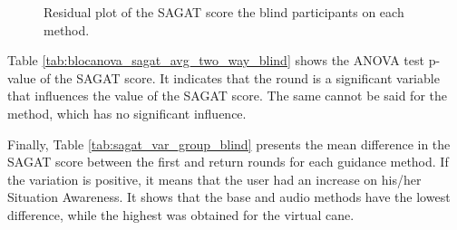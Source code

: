 \begin{figure}[!htb]
\begin{minipage}{0.45\textwidth}
        \caption{Residual plot of the SAGAT score the blind participants on each method.}
        \label{fig:residplot_sagat_avg_two_way_blind}
    \end{minipage}
\end{figure}

Table \ref{tab:blocanova_sagat_avg_two_way_blind} shows the ANOVA test p-value of the SAGAT score. It indicates that the round is a significant variable that influences the value of the SAGAT score. The same cannot be said for the method, which has no significant influence.



Finally, Table \ref{tab:sagat_var_group_blind} presents the mean difference in the SAGAT score between the first and return rounds for each guidance method. If the variation is positive, it means that the user had an increase on his/her Situation Awareness. It shows that the base and audio methods have the lowest difference, while the highest was obtained for the virtual cane.



\FloatBarrier